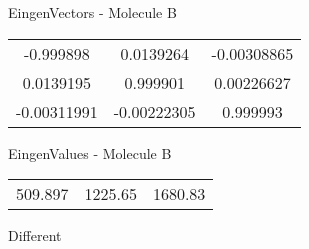 \begin{multicols}{2}
\begin{center}
\vtab
 EingenVectors - Molecule B     \\
\vtab
\begin{tabular}{|c c c|}
-0.999898	 & 	0.0139264	 & 	-0.00308865	 \\
0.0139195	 & 	0.999901	 & 	0.00226627	 \\
-0.00311991	 & 	-0.00222305	 & 	0.999993
\end{tabular}

\vtab
 EingenValues - Molecule B     \\
\vtab
\begin{tabular}{|c c c|}
509.897	 & 	1225.65	 & 	1680.83	 \\
\end{tabular}

\end{center}
\end{multicols}
\begin{center}
\vtab
\vtab
\textcolor{NavyBlue}{\Large Different}
\end{center}

 \newpage

